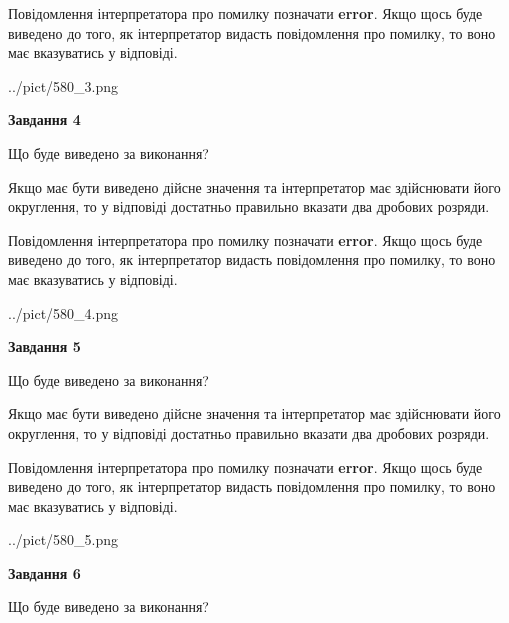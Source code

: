 \documentclass[12pt, ukrainian]{article}
\begin{document}
{\begin {Large}
Повідомлення інтерпретатора про помилку позначати \textbf{error}.
Якщо щось буде виведено до того, як інтерпретатор видасть повідомлення про помилку, 
то воно має вказуватись у відповіді. \par

\begin{center}
	{../pict/580_3.png}
\end{center}
\newpage

{\begin {center}\textbf{Завдання 4}\end {center}}\par
Що буде виведено за виконання? \par

Якщо має бути виведено дійсне значення та інтерпретатор має здійснювати його округлення, 
то у відповіді достатньо правильно вказати два дробових розряди.

Повідомлення інтерпретатора про помилку позначати \textbf{error}.
Якщо щось буде виведено до того, як інтерпретатор видасть повідомлення про помилку, 
то воно має вказуватись у відповіді. \par

\begin{center}
	{../pict/580_4.png}
\end{center}
\newpage

{\begin {center}\textbf{Завдання 5}\end {center}}\par
Що буде виведено за виконання? \par

Якщо має бути виведено дійсне значення та інтерпретатор має здійснювати його округлення, 
то у відповіді достатньо правильно вказати два дробових розряди.

Повідомлення інтерпретатора про помилку позначати \textbf{error}.
Якщо щось буде виведено до того, як інтерпретатор видасть повідомлення про помилку, 
то воно має вказуватись у відповіді. \par

\begin{center}
	{../pict/580_5.png}
\end{center}
\newpage

{\begin {center}\textbf{Завдання 6}\end {center}}\par
Що буде виведено за виконання? \par


\end{Large}}
\end{document}
